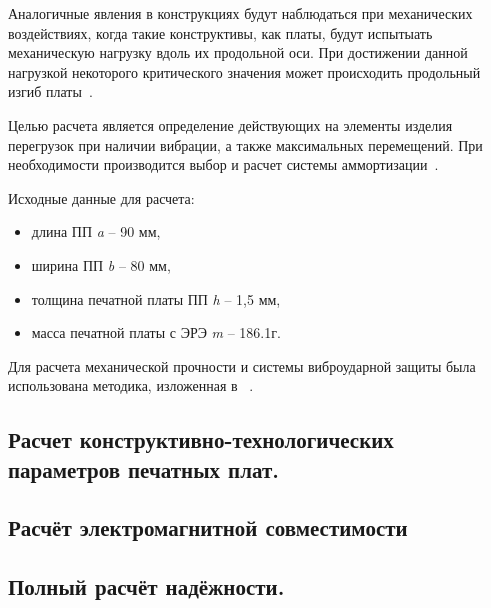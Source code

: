 Аналогичные явления в конструкциях будут наблюдаться при механических
воздействиях, когда такие конструктивы, как платы, будут испытыать
механическую нагрузку вдоль их продольной оси.
При достижении данной нагрузкой некоторого критического значения может
происходить продольный изгиб платы~\cite{Kalenkovich1989}.

Целью расчета является определение действующих на элементы изделия
перегрузок при наличии вибрации, а также максимальных перемещений.
При необходимости производится выбор и расчет системы
аммортизации~\cite{Kalenkovich2012}.

Исходные данные для расчета:
\begin{itemize}
\item длина ПП \textit{a} – 90 мм,
  
\item ширина ПП \textit{b} – 80 мм,
  
\item толщина печатной платы ПП \textit{h} – 1,5 мм,
  
\item масса печатной платы с ЭРЭ \textit{m} – 186.1г.
\end{itemize}

Для расчета механической прочности и системы виброударной защиты была
использована методика, изложенная в ~\cite{Kostukevich2011}.

\subsection{Расчет конструктивно-технологических параметров печатных плат. }


\subsection{Расчёт электромагнитной совместимости}


\subsection{Полный расчёт надёжности. }

